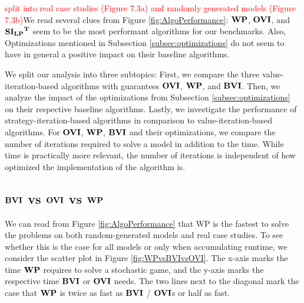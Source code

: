 \textcolor{red}{split into real case studies (Figure 7.3a) and randomly generated models (Figure 7.3b)}We read several clues from Figure \ref{fig:AlgoPerformance}:
$\mathbf{WP}$, $\mathbf{OVI}$, and $\mathbf{\mathbf{SI_{LP}}^T}$ seem to be the most performant algorithms for our benchmarks. 
Also, Optimizations mentioned in Subsection \ref{subsec:optimizations} do not seem to have in general a positive impact on their baseline algorithms.

We split our analysis into three subtopics: 
First, we compare the three value-iteration-based algorithms with guarantees $\mathbf{OVI}$, $\mathbf{WP}$, and $\mathbf{BVI}$. 
Then, we analyze the impact of the optimizations from Subsection \ref{subsec:optimizations} on their respective baseline algorithms.
Lastly, we investigate the performance of strategy-iteration-based algorithms in comparison to value-iteration-based algorithms.
For $\mathbf{OVI}$, $\mathbf{WP}$, $\mathbf{BVI}$ and their optimizations, we compare the number of iterations required to solve a model in addition to the time.
While time is practically more relevant, the number of iterations is independent of how optimized the implementation of the algorithm is.


\subsection{$\mathbf{BVI}$ vs $\mathbf{OVI}$ vs $\mathbf{WP}$}
We can read from Figure \ref{fig:AlgoPerformance} that WP is the fastest to solve the problems on both random-generated models and real case studies.
To see whether this is the case for all models or only when accumulating runtime, we consider the scatter plot in Figure \ref{fig:WPvsBVIvsOVI}.
The x-axis marks the time $\mathbf{WP}$ requires to solve a stochastic game, and the y-axis marks the respective time $\mathbf{BVI}$ or $\mathbf{OVI}$ needs.
The two lines next to the diagonal mark the case that $\mathbf{WP}$ is twice as fast as $\mathbf{BVI}$ / $\mathbf{OVI}$s or half as fast.

